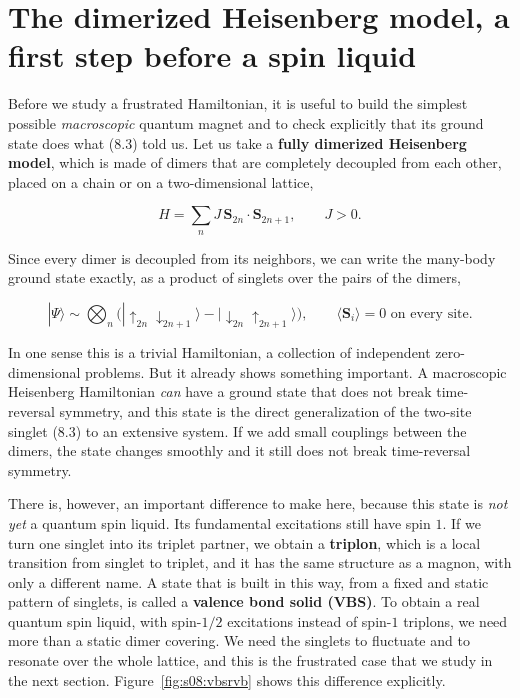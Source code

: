

\section{The dimerized Heisenberg model, a first step before a spin liquid}

Before we study a frustrated Hamiltonian, it is useful to build the simplest possible
\emph{macroscopic} quantum magnet and to check explicitly that its ground state does what (8.3)
told us. Let us take a \textbf{fully dimerized Heisenberg model}, which is made of dimers that are
completely decoupled from each other, placed on a chain or on a two-dimensional lattice,

\begin{equation}
H = \sum_n J\, \mathbf S_{2n}\cdot \mathbf S_{2n+1}, \qquad J>0.
\end{equation}

Since every dimer is decoupled from its neighbors, we can write the many-body ground state
exactly, as a product of singlets over the pairs of the dimers,

\begin{equation}
|\Psi\rangle \sim \bigotimes_n \Big(|{\uparrow_{2n}\downarrow_{2n+1}}\rangle -
|{\downarrow_{2n}\uparrow_{2n+1}}\rangle\Big), \qquad \langle \mathbf S_i\rangle = 0 \text{ on every
site}.
\end{equation}

In one sense this is a trivial Hamiltonian, a collection of independent zero-dimensional
problems. But it already shows something important. A macroscopic Heisenberg
Hamiltonian \emph{can} have a ground state that does not break time-reversal symmetry, and this
state is the direct generalization of the two-site singlet (8.3) to an extensive system. If we add
small couplings between the dimers, the state changes smoothly and it still does not break
time-reversal symmetry.

There is, however, an important difference to make here, because this state is \emph{not yet} a
quantum spin liquid. Its fundamental excitations still have spin $1$. If we turn one singlet into
its triplet partner, we obtain a \textbf{triplon}, which is a local transition from singlet to
triplet, and it has the same structure as a magnon, with only a different name. A state that is
built in this way, from a fixed and static pattern of singlets, is called a \textbf{valence bond
solid (VBS)}. To obtain a real quantum spin liquid, with spin-$1/2$ excitations instead of spin-$1$
triplons, we need more than a static dimer covering. We need the singlets to fluctuate and to
resonate over the whole lattice, and this is the frustrated case that we study in the next section.
Figure~\ref{fig:s08:vbsrvb} shows this difference explicitly.

